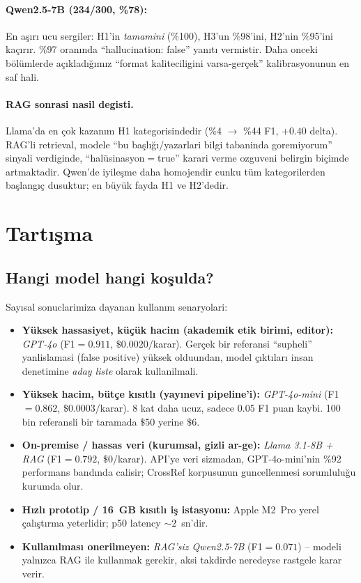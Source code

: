 \documentclass[11pt,a4paper]{article}
\begin{document}
\paragraph{Qwen2.5-7B (234/300, \%78):} En aşırı ucu sergiler: H1'in
\emph{tamamini} (\%100), H3'un \%98'ini, H2'nin \%95'ini kaçırır. \%97
oranında ``hallucination: false'' yanıtı vermistir. Daha onceki bölümlerde
açıkladığımız ``format kaliteciligini varsa-gerçek'' kalibrasyonunun en
saf hali.

\paragraph{RAG sonrasi nasil degisti.} Llama'da en çok kazanım H1
kategorisindedir (\%4 $\to$ \%44 F1, $+\!0.40$ delta). RAG'li retrieval,
modele ``bu başlığı/yazarlari bilgi tabaninda goremiyorum'' sinyali verdiginde,
``halüsinasyon$=$true'' karari verme ozguveni belirgin biçimde artmaktadir.
Qwen'de iyileşme daha homojendir cunku tüm kategorilerden başlangıç dusuktur;
en büyük fayda H1 ve H2'dedir.

\section{Tartışma}
\label{sec:tartışma}

\subsection{Hangi model hangi koşulda?}
Sayısal sonuclarimiza dayanan kullanım senaryolari:
\begin{itemize}[nosep]
\item \textbf{Yüksek hassasiyet, küçük hacim (akademik etik birimi,
editor):} \emph{GPT-4o} (F1$=0.911$, $\$0.0020/$karar). Gerçek bir
referansi ``supheli'' yanlislamasi (false positive) yüksek olduundan, model
çıktıları insan denetimine \emph{aday liste} olarak kullanilmali.
\item \textbf{Yüksek hacim, bütçe kısıtlı (yayınevi pipeline'i):}
\emph{GPT-4o-mini} (F1$=0.862$, $\$0.0003/$karar). 8 kat daha ucuz, sadece
$0.05$ F1 puan kaybi. 100 bin referansli bir taramada $\$50$ yerine $\$6$.
\item \textbf{On-premise / hassas veri (kurumsal, gizli ar-ge):}
\emph{Llama 3.1-8B + RAG} (F1$=0.792$, $\$0$/karar). API'ye veri
sizmadan, GPT-4o-mini'nin \%92 performans bandında calisir; CrossRef
korpusunun guncellenmesi sorumluluğu kurumda olur.
\item \textbf{Hızlı prototip / 16~GB kısıtlı iş istasyonu:} Apple M2~Pro
yerel çalıştırma yeterlidir; p50 latency $\sim 2$~sn'dir.
\item \textbf{Kullanılması onerilmeyen:} \emph{RAG'siz Qwen2.5-7B}
(F1$=0.071$) -- modeli yalnızca RAG ile kullanmak gerekir, aksi takdirde
neredeyse rastgele karar verir.
\end{itemize}
\end{document}
